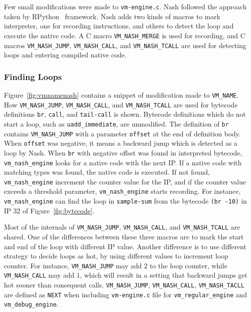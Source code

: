 \documentclass[preprint]{sigplanconf}
\begin{document}
Few small modifications were made to \texttt{vm-engine.c}. Nash followed the
approach taken by RPython~\cite{bolz2009tracing} framework. Nash adds two kinds
of macros to mark interpreter, one for recording instructions, and others to
detect the loop and execute the native code. A C macro \texttt{VM\_NASH\_MERGE}
is used for recording, and C macros \texttt{VM\_NASH\_JUMP},
\texttt{VM\_NASH\_CALL}, and \texttt{VM\_NASH\_TCALL} are used for detecting
loops and entering compiled native code.

\subsubsection{Finding Loops}

Figure~\hyperref[fig:vmnamenash]{\ref{fig:vmnamenash}} contains a snippet of
modification made to \texttt{VM\_NAME}. How \texttt{VM\_NASH\_JUMP},
\texttt{VM\_NASH\_CALL}, and \texttt{VM\_NASH\_TCALL} are used for bytecode
definitions \texttt{br}, \texttt{call}, and \texttt{tail-call} is shown.
Bytecode definitions which do not start a loop, such as
\texttt{uadd\_immediate}, are unmodified. The definition of \texttt{br} contains
\texttt{VM\_NASH\_JUMP} with a parameter \texttt{offset} at the end of
definition body. When \texttt{offset} was negative, it means a backward jump
which is detected as a loop by Nash. When \texttt{br} with negative offset was
found in interpreted bytecode, \texttt{vm\_nash\_engine} looks for a native code
with the next IP.\@
If a native code with matching types was found, the native code is executed. If
not found, \texttt{vm\_nash\_engine} increment the counter value for the IP, and
if the counter value exceeds a threshold parameter, \texttt{vm\_nash\_engine}
starts recording. For instance, \texttt{vm\_nash\_engine} can find the loop in
\texttt{sample-sum} from the bytecode \texttt{(br~-10)} in IP $32$ of
Figure~\hyperref[fig:bytecode]{\ref{fig:bytecode}}.

Most of the internals of \texttt{VM\_NASH\_JUMP}, \texttt{VM\_NASH\_CALL}, and
\texttt{VM\_NASH\_TCALL} are shared. One of the differences between these three
macros are to mark the start and end of the loop with different IP
value. Another difference is to use different strategy to decide loops as hot,
by using different values to increment loop counter. For instance,
\texttt{VM\_NASH\_JUMP} may add $2$ to the loop counter, while
\texttt{VM\_NASH\_CALL} may add $1$, which will result in a setting that
backward jumps get hot sooner than consequent calls. \texttt{VM\_NASH\_JUMP},
\texttt{VM\_NASH\_CALL}, \texttt{VM\_NASH\_TACLL} are defined as \texttt{NEXT}
when including \texttt{vm-engine.c} file for \texttt{vm\_regular\_engine} and
\texttt{vm\_debug\_engine}.
\end{document}
